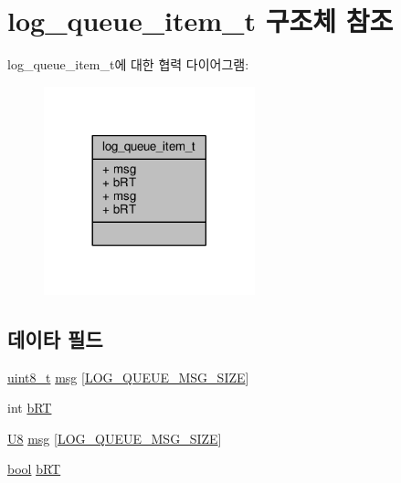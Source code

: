 \hypertarget{structlog__queue__item__t}{}\section{log\+\_\+queue\+\_\+item\+\_\+t 구조체 참조}
\label{structlog__queue__item__t}


log\+\_\+queue\+\_\+item\+\_\+t에 대한 협력 다이어그램\+:
\nopagebreak
\begin{figure}[H]
\begin{center}
\leavevmode
\includegraphics[width=173pt]{structlog__queue__item__t__coll__graph}
\end{center}
\end{figure}
\subsection*{데이타 필드}
\begin{DoxyCompactItemize}
\item 
\hyperlink{stdint_8h_aba7bc1797add20fe3efdf37ced1182c5}{uint8\+\_\+t} \hyperlink{structlog__queue__item__t_ad6dd0ed011025f01f3d77d2e437d5a10}{msg} \mbox{[}\hyperlink{include_2openavb__log__pub_8h_ace4b5ac6252fb610e40107f5db456643}{L\+O\+G\+\_\+\+Q\+U\+E\+U\+E\+\_\+\+M\+S\+G\+\_\+\+S\+I\+ZE}\mbox{]}
\item 
int \hyperlink{structlog__queue__item__t_a30f8c58f5752c309e3ea89708f8dff4f}{b\+RT}
\item 
\hyperlink{openavb__types__base__pub_8h_aa63ef7b996d5487ce35a5a66601f3e73}{U8} \hyperlink{structlog__queue__item__t_ae1f33cba442b6de8afc7645e33d76f54}{msg} \mbox{[}\hyperlink{include_2openavb__log__pub_8h_ace4b5ac6252fb610e40107f5db456643}{L\+O\+G\+\_\+\+Q\+U\+E\+U\+E\+\_\+\+M\+S\+G\+\_\+\+S\+I\+ZE}\mbox{]}
\item 
\hyperlink{avb__gptp_8h_af6a258d8f3ee5206d682d799316314b1}{bool} \hyperlink{structlog__queue__item__t_ac20dbee46f0cffb75595c9e14bb10d2c}{b\+RT}
\end{DoxyCompactItemize}



